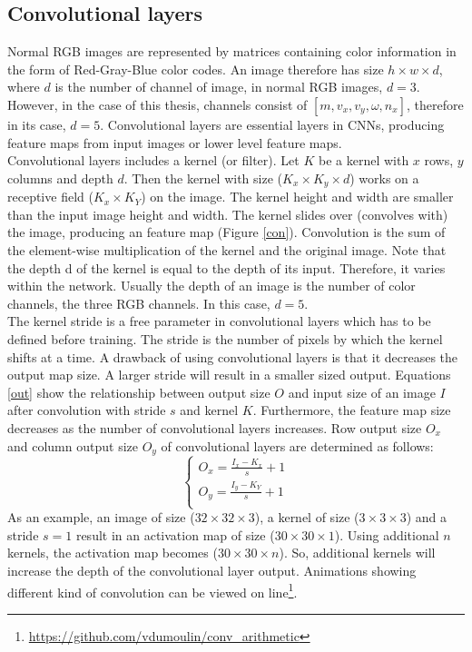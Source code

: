     \subsection{Convolutional layers}
    Normal RGB images are represented by matrices containing color information in the form of Red-Gray-Blue color codes. An image therefore has size $h\times w \times d$, where $d$ is the number of channel of image, in normal RGB images, $d=3$. However, in the case of this thesis, channels consist of $[m, v_x, v_y, \omega, n_x]$, therefore in its case, $d=5$. Convolutional layers are essential layers in CNNs, producing feature maps from input images or lower level feature maps. \\

    Convolutional layers includes a kernel (or filter). Let $K$ be a kernel with $x$ rows, $y$ columns and depth $d$. Then the kernel with size ($K_x \times K_y \times d$) works on a receptive field ($K_x \times K_Y$) on the image. The kernel height and width are smaller than the input image height and width. The kernel slides over (convolves with) the image, producing an feature map (Figure \ref{con}). Convolution is the sum of the element-wise multiplication of the kernel and the original image. Note that the depth d of the kernel is equal to the depth of its input. Therefore, it varies within the network. Usually the depth of an image is the number of color channels, the three RGB channels. In this case, $d=5$. \\

    The kernel stride is a free parameter in convolutional layers which has to be defined before training. The stride is the number of pixels by which the kernel shifts at a time. A drawback of using convolutional layers is that it decreases the output map size. A larger stride will result in a smaller sized output. Equations \ref{out} show the relationship between output size $O$ and input size of an image $I$ after convolution with stride $s$ and kernel $K$. Furthermore, the feature map size decreases as the number of convolutional layers increases. Row output size $O_x$ and column output size $O_y$ of convolutional layers are determined as follows:
    \begin{equation}
        \begin{cases}
            O_x = \frac{I_x-K_x}{s} + 1 \\
            O_y = \frac{I_y - K_Y}{s} + 1 \\
        \end{cases}
        \label{out}
    \end{equation}
    As an example, an image of size ($32\times 32 \times 3$), a kernel of size ($3\times 3\times 3$) and a stride $s=1$ result in an activation map of size ($30 \times 30 \times 1$). Using additional $n$ kernels, the activation map becomes ($30\times30\times n$). So, additional kernels will increase the depth of the convolutional layer output. Animations showing different kind of convolution can be viewed on line\footnote{\url{https://github.com/vdumoulin/conv_arithmetic}}.\\

